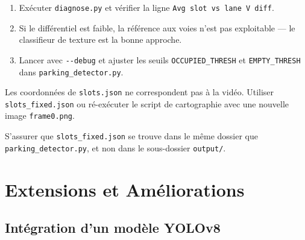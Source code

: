 \documentclass[12pt,a4paper]{report}
\begin{document}
\vspace{0.5em}

\begin{tcolorbox}[colback=myred!5, colframe=myred!60, title={Tous les emplacements affichés comme OCCUPÉS}, fonttitle=\small\bfseries, breakable]
\begin{enumerate}
  \item Exécuter \texttt{diagnose.py} et vérifier la ligne \texttt{Avg slot vs lane V diff}.
  \item Si le différentiel est faible, la référence aux voies n'est pas exploitable — le classifieur de texture est la bonne approche.
  \item Lancer avec \texttt{-{}-debug} et ajuster les seuils \texttt{OCCUPIED\_THRESH} et \texttt{EMPTY\_THRESH} dans \texttt{parking\_detector.py}.
\end{enumerate}
\end{tcolorbox}

\vspace{0.5em}

\begin{tcolorbox}[colback=myred!5, colframe=myred!60, title={Emplacements couvrant les voies de circulation}, fonttitle=\small\bfseries]
Les coordonnées de \texttt{slots.json} ne correspondent pas à la vidéo. Utiliser \texttt{slots\_fixed.json} ou ré-exécuter le script de cartographie avec une nouvelle image \texttt{frame0.png}.
\end{tcolorbox}

\vspace{0.5em}

\begin{tcolorbox}[colback=myred!5, colframe=myred!60, title={\texttt{ERROR: slots file not found}}, fonttitle=\small\bfseries]
S'assurer que \texttt{slots\_fixed.json} se trouve dans le même dossier que \texttt{parking\_detector.py}, et non dans le sous-dossier \texttt{output/}.
\end{tcolorbox}

\chapter{Extensions et Améliorations}

\section{Intégration d'un modèle YOLOv8}
\end{document}
